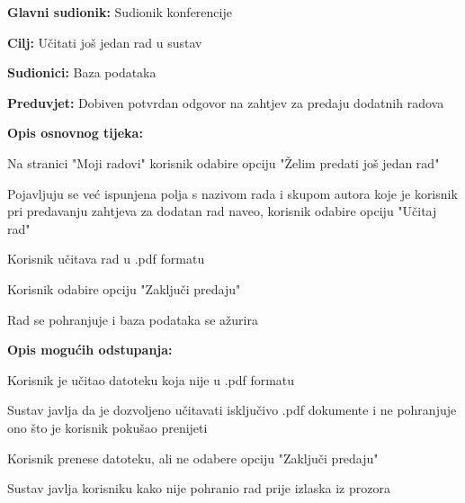 					\begin{packed_item}
						
						\item \textbf{Glavni sudionik:} Sudionik konferencije
						\item \textbf{Cilj:} Učitati još jedan rad u sustav
						\item \textbf{Sudionici:} Baza podataka
						\item \textbf{Preduvjet:} Dobiven potvrdan odgovor na zahtjev za predaju dodatnih radova
						\item \textbf{Opis osnovnog tijeka:}
						
						\item[] \begin{packed_enum}
							
							\item Na stranici "Moji radovi" korisnik odabire opciju "Želim predati još jedan rad"
							\item Pojavljuju se već ispunjena polja s nazivom rada i skupom autora koje je korisnik pri predavanju zahtjeva za dodatan rad naveo, korisnik odabire opciju "Učitaj rad"
							\item Korisnik učitava rad u .pdf formatu
							\item Korisnik odabire opciju "Zaključi predaju"
							\item Rad se pohranjuje i baza podataka se ažurira
							
						\end{packed_enum} 
					
					\item \textbf{Opis mogućih odstupanja:}
					
					\item[] \begin{packed_item}
						\item[3.a] Korisnik je učitao datoteku koja nije u .pdf formatu
						
						\item [] \begin{packed_enum}
							\item Sustav javlja da je dozvoljeno učitavati isključivo .pdf dokumente i ne pohranjuje ono što je korisnik pokušao prenijeti
							
						\end{packed_enum}
					
						\item[3.b] Korisnik prenese datoteku, ali ne odabere opciju "Zaključi predaju"
						
						\item[] \begin{packed_enum}
							\item Sustav javlja korisniku kako nije pohranio rad prije izlaska iz prozora
						\end{packed_enum}
					
					\end{packed_item}
						
					\end{packed_item}

